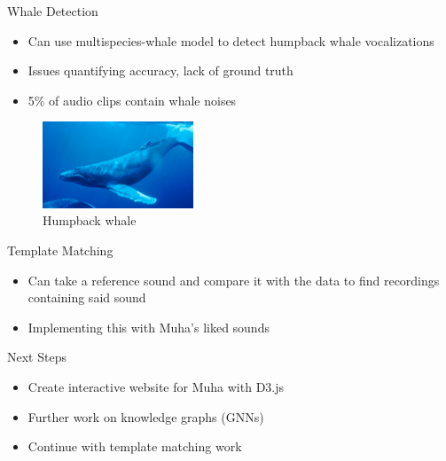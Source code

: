 \begin{frame}{Whale Detection}
    \begin{itemize}
        \item Can use multispecies-whale model to detect humpback whale vocalizations
        \item Issues quantifying accuracy, lack of ground truth
        \item 5\% of audio clips contain whale noises
    \end{itemize}
    \begin{figure}
        \centering
        \includegraphics[height=0.4\textheight,width=0.4\textwidth,keepaspectratio]{images/humpback_whale.jpg}
        \caption{Humpback whale}
    \end{figure}
\end{frame}

\begin{frame}{Template Matching}
    \begin{itemize}
        \item Can take a reference sound and compare it with the data to find recordings containing said sound
        \item Implementing this with Muha's liked sounds
    \end{itemize}
\end{frame}

\begin{frame}{Next Steps}
    \begin{itemize}
        \item Create interactive website for Muha with D3.js
        \item Further work on knowledge graphs (GNNs)
        \item Continue with template matching work
    \end{itemize}
\end{frame}

